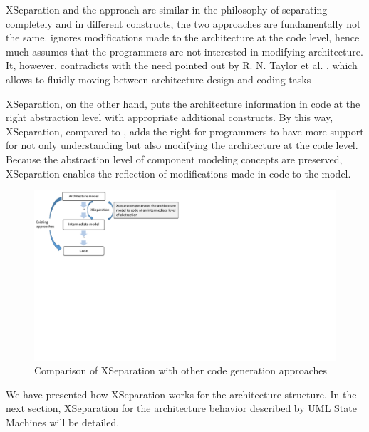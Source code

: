 XSeparation and the  approach are similar in the philosophy of separating completely  and  in different constructs, the two approaches are fundamentally not the same. 
 ignores modifications made to the architecture at the code level, hence much assumes that the programmers are not interested in modifying architecture.
It, however, contradicts with the need pointed out by R. N. Taylor et al. \cite{Taylor:2007:SDA:1253532.1254721}, which allows to fluidly moving between architecture design and coding tasks 

XSeparation, on the other hand, puts the architecture information in code at the right abstraction level with appropriate additional constructs.
By this way, XSeparation, compared to , adds the right for programmers to have more support for not only understanding but also modifying the architecture at the code level.
Because the abstraction level of component modeling concepts are preserved, XSeparation enables the reflection of modifications made in code to the model.

\begin{figure}
	\centering
	\includegraphics[clip, trim=0cm 11.3cm 17.6cm 0cm, width=\columnwidth]{figures/transformationchain.pdf}
	\caption{Comparison of XSeparation with other code generation approaches} 
	\label{fig:transformationchain}
\end{figure}


We have presented how XSeparation works for the architecture structure.
In the next section, XSeparation for the architecture behavior described by UML State Machines will be detailed.